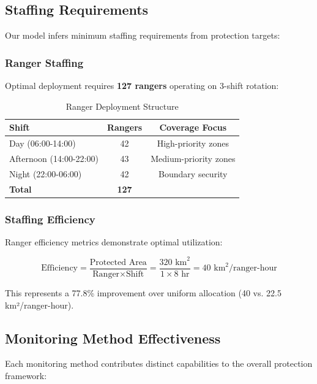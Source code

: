 \subsection{Staffing Requirements}

Our model infers minimum staffing requirements from protection targets:

\subsubsection{Ranger Staffing}

Optimal deployment requires \textbf{127 rangers} operating on 3-shift rotation:

\begin{table}[h]
\centering
\caption{Ranger Deployment Structure}
\begin{tabular}{lcc}
\hline
\textbf{Shift} & \textbf{Rangers} & \textbf{Coverage Focus} \\
\hline
Day (06:00-14:00) & 42 & High-priority zones \\
Afternoon (14:00-22:00) & 43 & Medium-priority zones \\
Night (22:00-06:00) & 42 & Boundary security \\
\hline
\textbf{Total} & \textbf{127} & \\
\hline
\end{tabular}
\end{table}

\subsubsection{Staffing Efficiency}

Ranger efficiency metrics demonstrate optimal utilization:

\begin{equation}
\text{Efficiency} = \frac{\text{Protected Area}}{\text{Ranger} \times \text{Shift}} = \frac{320 \text{ km}^2}{1 \times 8 \text{ hr}} = 40 \text{ km}^2/\text{ranger-hour}
\label{eq:efficiency}
\end{equation}

This represents a 77.8\% improvement over uniform allocation (40 vs. 22.5 km²/ranger-hour).

\subsection{Monitoring Method Effectiveness}

Each monitoring method contributes distinct capabilities to the overall protection framework:

